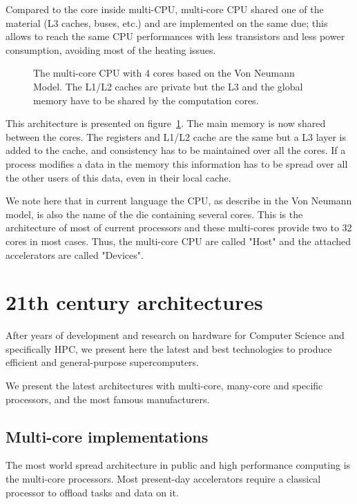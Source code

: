 Compared to the core inside multi-CPU, multi-core CPU shared one of the material (L3 caches, buses, etc.) and are implemented on the same due; this allows to reach the same CPU performances with less transistors and less power consumption, avoiding most of the heating issues. 

\begin{figure}
\centering 

\caption[Multi-core processor representation]{The multi-core CPU with 4 cores based on the Von Neumann Model. The L1/L2 caches are private but the L3 and the global memory have to be shared by the computation cores.}
\label{fig:2_HARD:von_neumann_model_multi-core}
\end{figure}

This architecture is presented on figure~\ref{fig:2_HARD:von_neumann_model_multi-core}.
The main memory is now shared between the cores. 
The registers and L1/L2 cache are the same but a L3 layer is added to the cache, and consistency has to be maintained over all the cores. 
If a process modifies a data in the memory this information has to be spread over all the other users of this data, even in their local cache. 

We note here that in current language the CPU, as describe in the Von Neumann model, is also the name of the die containing several cores. 
This is the architecture of most of current processors and these multi-cores provide two to 32 cores in most cases. 
Thus, the multi-core CPU are called "Host" and the attached accelerators are called "Devices".

\section{21th century architectures}
After years of development and research on hardware for Computer Science and specifically HPC, we present here the latest and best technologies to produce efficient and general-purpose supercomputers.

We present the latest architectures with multi-core, many-core and specific processors, and the most famous manufacturers. 

\subsection{Multi-core implementations}
The most world spread architecture in public and high performance computing is the multi-core processors. 
Most present-day accelerators require a classical processor to offload tasks and data on it. 


